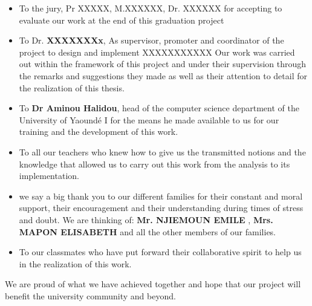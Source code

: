 \documentclass[12pt,a4paper,oneside]{extbook}
\begin{document}
\begin{itemize}
    

\item To the jury, Pr XXXXX, M.XXXXXX, Dr. XXXXXX for accepting to evaluate our
work at the end of this graduation project



\item To Dr. \textbf{ XXXXXXXx}, As supervisor, promoter and coordinator of the project to design and implement XXXXXXXXXXX Our work was carried out within the framework of this project and under their supervision through the remarks and suggestions they made as well as their attention to detail for the realization of this thesis.


\item To \textbf{Dr Aminou Halidou}, head of the computer science department of the University of Yaoundé I for the means he made available to us for our training and the development of this work.

\item To all our teachers who knew how to give us the transmitted notions and the knowledge that allowed us to carry out this work from the analysis to its implementation.

\item we say a big thank you to our different families for their constant and moral support, their encouragement and their understanding during times of stress and doubt. We are thinking of: \textbf{ Mr. NJIEMOUN EMILE }, \textbf{ Mrs. MAPON ELISABETH}  and all the other members of our families.

\item To our classmates who have put forward their collaborative spirit to help us in the realization of this work.

 
\end{itemize}
We are proud of what we have achieved together and hope that our project will benefit the university community and beyond.


\tableofcontents
\listoftables

\renewcommand{\listfigurename}{Liste des figures}
\listoffigures

\newpage
\end{document}
